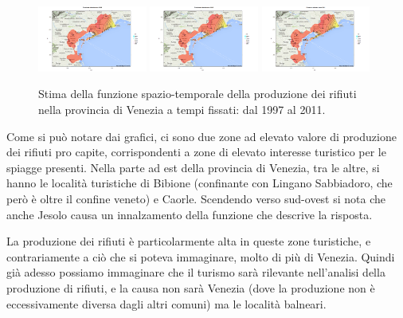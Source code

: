 \documentclass[a4paper,11pt,twoside,openright]{book}							%
\begin{document}
\begin{figure}[H]
\includegraphics[trim=0cm 0cm 4cm 0cm,clip=true,width=0.32\textwidth]{Immagini/venezia_senza_covariate/Maps2009.png}
\includegraphics[trim=0cm 0cm 4cm 0cm,clip=true,width=0.32\textwidth]{Immagini/venezia_senza_covariate/Maps2010.png}
\includegraphics[trim=0cm 0cm 4cm 0cm,clip=true,width=0.32\textwidth]{Immagini/venezia_senza_covariate/Maps2011.png}
\caption{Stima della funzione spazio-temporale della produzione dei rifiuti nella provincia di Venezia a tempi fissati: dal 1997 al 2011.}
\label{fig:Ven_ris}
\end{figure}

\newpage

Come si può notare dai grafici, ci sono due zone ad elevato valore di produzione dei rifiuti pro capite, corrispondenti a zone di elevato interesse turistico per le spiagge presenti. Nella parte ad est della provincia di Venezia, tra le altre, si hanno le località turistiche di Bibione (confinante con Lingano Sabbiadoro, che però è oltre il confine veneto) e Caorle. Scendendo verso sud-ovest si nota che anche Jesolo causa un innalzamento della funzione che descrive la risposta.

La produzione dei rifiuti è particolarmente alta in queste zone turistiche, e contrariamente a ciò che si poteva immaginare, molto di più di Venezia. Quindi già adesso possiamo immaginare che il turismo sarà rilevante nell'analisi della produzione di rifiuti, e la causa non sarà Venezia (dove la produzione non è eccessivamente diversa dagli altri comuni) ma le località balneari.
\end{document}
